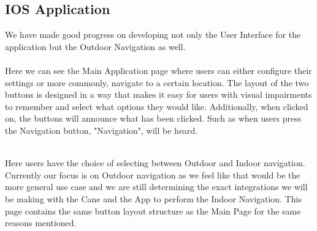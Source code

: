 \documentclass[letterpaper,12pt]{article}
\begin{document}
\newpage

\subsection{IOS Application}

    We have made good progress on developing not only the User Interface for the application but the Outdoor Navigation as well. \\
    
 \\

    Here we can see the Main Application page where users can either configure their settings or more commonly, navigate to a certain location. The layout of the two buttons is designed in a way that makes it easy for users with visual impairments to remember and select what options they would like. Additionally, when clicked on, the buttons will announce what has been clicked. Such as when users press the Navigation button, "Navigation", will be heard.
    

 \\

    Here users have the choice of selecting between Outdoor and Indoor navigation. Currently our focus is on Outdoor navigation as we feel like that would be the more general use case and we are still determining the exact integrations we will be making with the Cane and the App to perform the Indoor Navigation. This page contains the same button layout structure as the Main Page for the same reasons mentioned.\\
    
    
 \\
    
\end{document}
